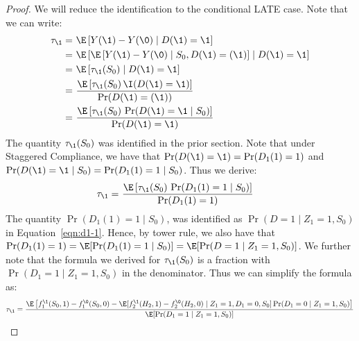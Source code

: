\begin{proof}
We will reduce the identification to the conditional LATE case. Note that we can write:
\begin{align*}
    \tau_{\1} =~& \E\left[Y(\1) - Y(\0) \mid D(\1)=\1\right]\\
    =~& \E\left[\E\left[Y(\1) - Y(\0)\mid S_0, D(\1)=(\1)\right] \mid D(\1)=\1\right]\\
    =~& \E\left[\tau_{\1}(S_0) \mid D(\1)=\1\right]\\
    =~& \frac{\E\left[\tau_{\1}(S_0)\, \I(D(\1)=\1)\right]}{\Pr(D(\1)=(\1))}\\
    =~& \frac{\E\left[\tau_{\1}(S_0)\, \Pr(D(\1)=\1 \mid S_0)\right]}{\Pr(D(\1)=\1)}
\end{align*}
The quantity $\tau_{\1}(S_0)$ was identified in the prior section. Note that under Staggered Compliance, we have that $\Pr(D(\1)=\1)=\Pr(D_1(1)=1)$ and $\Pr(D(\1)=\1\mid S_0)=\Pr(D_1(1)=1\mid S_0)$. Thus we derive:
\begin{align}
    \tau_{\1} =~& \frac{\E\left[\tau_{\1}(S_0)\, \Pr(D_1(1)=1 \mid S_0)\right]}{\Pr(D_1(1)=1)}
\end{align}
The quantity $\Pr(D_1(1)=1\mid S_0)$, was identified as $\Pr(D=1\mid Z_1=1, S_0)$ in Equation~\eqref{eqn:d1-1}. Hence, by tower rule, we also have that $\Pr(D_1(1)=1)=\E[\Pr(D_1(1)=1\mid S_0)] = \E[\Pr(D=1\mid Z_1=1, S_0)]$.
We further note that the formula we derived for $\tau_\1(S_0)$ is a fraction with $\Pr(D_1=1\mid Z_1=1, S_0)$ in the denominator. Thus we can simplify the formula as:
\begin{align*}
    \tau_\1 = \frac{\E\left[f_1^{\1}(S_0,1) - f_1^{\0}(S_0, 0) - \E[f_2^{\1}(H_2, 1) - f_2^{\0}(H_2,0)\mid Z_1=1, D_1=0, S_0]\Pr(D_1=0\mid Z_1=1, S_0)\right]}{\E[\Pr(D_1=1\mid Z_1=1, S_0)]}
\end{align*}
 




\end{proof}
